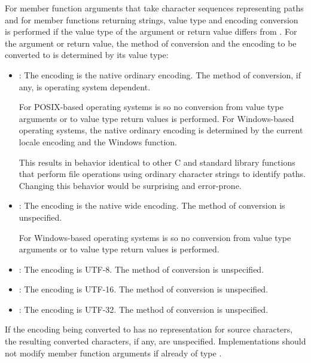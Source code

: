 \pnum
For member function arguments that take character sequences representing
paths and for member functions returning strings, value type and encoding
conversion is performed if the value type of the argument or return value differs from
.
For the argument or return value, the method of conversion and the encoding
to be converted to is determined
by its value type:
\begin{itemize}
\item {}: The encoding is the native ordinary encoding.
The method of conversion, if any, is operating system dependent.
\begin{note}
For POSIX-based operating systems  is 
so no conversion from  value type arguments or to 
value type return values is performed.
For Windows-based operating systems, the
native ordinary encoding is determined by
the current locale encoding and the Windows  function.
\end{note}
\begin{note}
This results in behavior identical to other C and \Cpp{}
standard library functions that perform file operations using ordinary character
strings to identify paths. Changing this behavior would be surprising and
error-prone.
\end{note}
\item {}: The encoding is the native wide encoding.
The method of conversion is unspecified.
\begin{note}
For Windows-based operating systems  is 
so no conversion from  value type arguments or to 
value type return values is performed.
\end{note}
\item
{}%
: The encoding is UTF-8. The method of conversion
is unspecified.
\item
{}%
: The encoding is UTF-16. The method of conversion
is unspecified.
\item
{}%
: The encoding is UTF-32. The method of conversion
is unspecified.
\end{itemize}

\pnum
If the encoding being converted to has no representation for source
characters, the resulting converted characters, if any, are unspecified.
Implementations should not modify member function arguments
if already of type .

